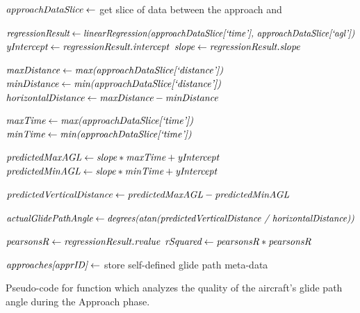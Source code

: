             
            \begin{algorithm}
                \begin{algorithmic}[1]\raggedright
                    \State $ \textit{approachDataSlice} \gets $ get slice of data between the approach  and 
                    
                    \State $ \var{regressionResult} \gets \var{linearRegression(} \break \var{approachDataSlice[`time'], approachDataSlice[`agl'])} $
                    \State $ \textit{yIntercept} \gets \textit{regressionResult.intercept} $
                    \State $ \textit{slope} \gets \textit{regressionResult.slope} $
                    
                    \State $ \textit{maxDistance} \gets \textit{max(approachDataSlice[`distance'])} $
                    \State $ \textit{minDistance} \gets \textit{min(approachDataSlice[`distance'])} $
                    \State $ \textit{horizontalDistance} \gets \textit{maxDistance} - \textit{minDistance} $
                    
                    \State $ \textit{maxTime} \gets \textit{max(approachDataSlice[`time'])} $
                    \State $ \textit{minTime} \gets \textit{min(approachDataSlice[`time'])} $
                    
                    \State $ \textit{predictedMaxAGL} \gets \textit{slope} * \textit{maxTime} + \textit{yIntercept} $
                    \State $ \textit{predictedMinAGL} \gets \textit{slope} * \textit{minTime} + \textit{yIntercept} $
                    
                    \State $ \textit{predictedVerticalDistance} \gets \textit{predictedMaxAGL} - \textit{predictedMinAGL} $
                    
                    \State $ \var{actualGlidePathAngle} \gets \var{degrees(} \break \var{atan(predictedVerticalDistance / horizontalDistance))} $
                    
                    \State $ \textit{pearsonsR} \gets \textit{regressionResult.rvalue} $
                    \State $ \textit{rSquared} \gets \textit{pearsonsR} * \textit{pearsonsR} $
                    
                    \State $ \textit{approaches[apprID]} \gets $ store self-defined glide path meta-data
                    \State \Return {}
                \EndFunction
                \end{algorithmic}
                \caption{Pseudo-code for function which analyzes the quality of the aircraft's glide path angle during the Approach phase.}
                \label{alg:analyze_glide_path}
            \end{algorithm}
    
